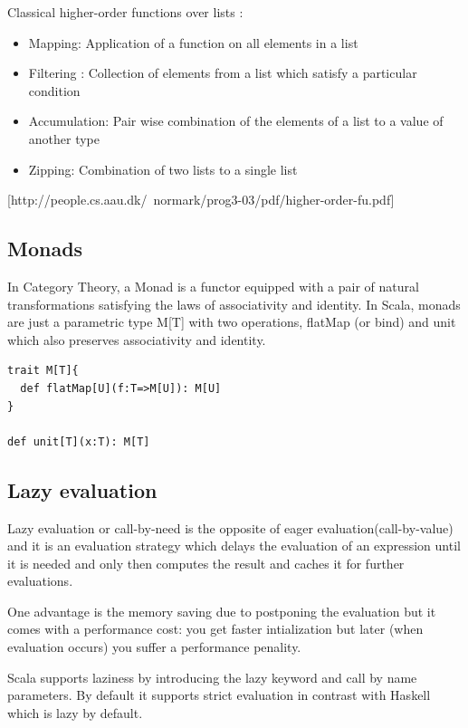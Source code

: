 \documentclass{article}
\begin{document}
Classical higher-order functions over lists :

\begin{itemize}
\item Mapping: Application of a function on all elements in a list
\item Filtering : Collection of elements from a list which satisfy a particular condition
\item Accumulation: Pair wise combination of the elements of a list to a value of
another type
\item Zipping: Combination of two lists to a single list
\end{itemize}
[http://people.cs.aau.dk/~normark/prog3-03/pdf/higher-order-fu.pdf]


\subsection {Monads}  \label{monads}
In Category Theory, a Monad is a functor equipped with a pair of natural transformations satisfying the laws of associativity and identity. In Scala, monads are just a parametric type M[T] with two operations, flatMap (or bind) and unit which also preserves associativity and identity. \par

\begin{lstlisting}
trait M[T]{
  def flatMap[U](f:T=>M[U]): M[U]
}

def unit[T](x:T): M[T]
\end{lstlisting}

\subsection {Lazy evaluation}
Lazy evaluation or call-by-need is the opposite of eager evaluation(call-by-value) and it is an evaluation strategy which delays the evaluation of an expression until it is needed and only then computes the result and caches it for further evaluations. \par
One advantage is the memory saving due to postponing the evaluation but it comes with a performance cost: you get faster intialization but later (when evaluation occurs) you suffer a performance penality.\par

Scala supports laziness by introducing the lazy keyword and call by name parameters. By default it supports strict evaluation in contrast with Haskell which is lazy by default.
\end{document}
